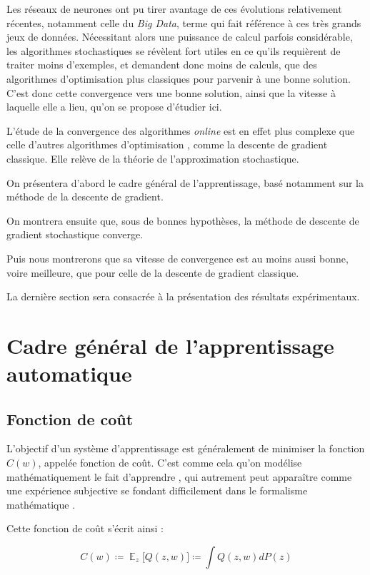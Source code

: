 \documentclass{article}
\DeclareMathOperator*{\E}{\mathbb{E}} %
\begin{document}
Les réseaux de neurones ont pu tirer avantage de ces évolutions relativement récentes, notamment celle du \emph{Big Data}, terme qui fait référence à ces très grands jeux de données. Nécessitant alors une puissance de calcul parfois considérable, les algorithmes stochastiques se révèlent fort utiles en ce qu'ils requièrent de traiter moins d'exemples, et demandent donc moins de calculs, que des algorithmes d'optimisation plus classiques pour parvenir à une bonne solution. C'est donc cette convergence vers une bonne solution, ainsi que la vitesse à laquelle elle a lieu, qu'on se propose d'étudier ici.
\bigskip

L'étude de la convergence des algorithmes \emph{online} est en effet plus complexe que celle d'autres algorithmes d'optimisation \cite{bottou-91c}, comme la descente de gradient classique. Elle relève de la théorie de l'approximation stochastique. 
\bigskip

On présentera d'abord le cadre général de l'apprentissage, basé notamment sur la méthode de la descente de gradient. 

On montrera ensuite que, sous de bonnes hypothèses, la méthode de descente de gradient stochastique converge.

Puis nous montrerons que sa vitesse de convergence est au moins aussi bonne, voire meilleure, que pour celle de la descente de gradient classique.

La dernière section sera consacrée à la présentation des résultats expérimentaux.

\section{Cadre général de l'apprentissage automatique}

\subsection{Fonction de coût}

L'objectif d'un système d'apprentissage est généralement de minimiser la fonction $C(w)$, appelée fonction de coût. C'est comme cela qu'on modélise mathématiquement le fait d'apprendre \cite{bottou-91a}, qui autrement peut apparaître comme une expérience subjective se fondant difficilement dans le formalisme mathématique  \cite{Bottou98on-linelearning}. 

\bigskip
Cette fonction de coût s'écrit ainsi :

\begin{equation} \label{eq(2.7)}
    C(w) \coloneqq {\textstyle \E_{z}} \big[Q(z, w)\big] \coloneqq \int Q(z, w) dP(z)
\end{equation} %
\end{document}
